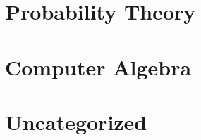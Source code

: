 \documentclass{report}
\begin{document}
\chapter{Probability Theory}
\renewcommand{\cat}{PT}




\chapter{Computer Algebra}
\renewcommand{\cat}{CP}


\chapter{Uncategorized}
\renewcommand{\cat}{UN}

\end{document}
